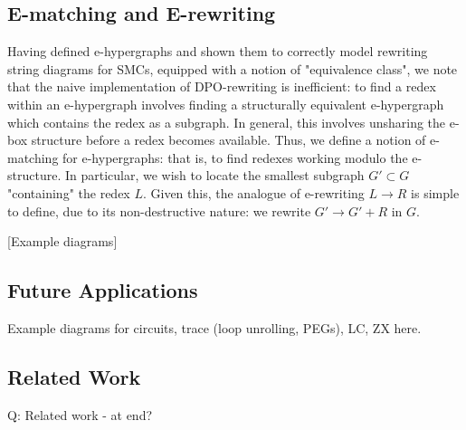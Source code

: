\subsection*{E-matching and E-rewriting}

Having defined e-hypergraphs and shown them to correctly model rewriting string diagrams for SMCs, equipped with a notion of "equivalence class", we note that the naive implementation of DPO-rewriting is inefficient: to find a redex within an e-hypergraph involves finding a structurally equivalent e-hypergraph which contains the redex as a subgraph. In general, this involves unsharing the e-box structure before a redex becomes available. Thus, we define a notion of e-matching for e-hypergraphs: that is, to find redexes working modulo the e-structure. In particular, we wish to locate the smallest subgraph $G' \subset G$ "containing" the redex $L$. Given this, the analogue of e-rewriting $L \to R$ is simple to define, due to its non-destructive nature: we rewrite $G' \to G' + R$ in $G$. 

[Example diagrams]

\subsection*{Future Applications}

Example diagrams for circuits, trace (loop unrolling, PEGs), LC, ZX here.

\subsection{Related Work}
Q: Related work - at end? \\